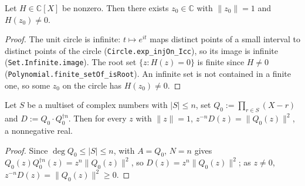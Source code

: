 \begin{lemma}
    \label{lem:fr-positive-multiple-point}
    \leanok
    Let $H \in \mathbb{C}[X]$ be nonzero. Then there exists $z_0 \in \mathbb{C}$
    with $\|z_0\| = 1$ and $H(z_0) \neq 0$.
\end{lemma}
\begin{proof}
    The unit circle is infinite: $t \mapsto e^{i t}$ maps distinct points of a
    small interval to distinct points of the circle
    (\texttt{Circle.exp\_injOn\_Icc}), so its image is infinite
    (\texttt{Set.Infinite.image}). The root set $\{z : H(z) = 0\}$ is finite
    since $H \neq 0$ (\texttt{Polynomial.finite\_setOf\_isRoot}). An infinite set
    is not contained in a finite one, so some $z_0$ on the circle has
    $H(z_0) \neq 0$.
\end{proof}

\begin{lemma}
    \label{lem:fr-D-eval-circle}
    \leanok
    Let $S$ be a multiset of complex numbers with $|S| \le n$, set
    $Q_0 := \prod_{r\in S}(X-r)$ and $D := Q_0\cdot Q_0^{\dagger n}$. Then for
    every $z$ with $\|z\| = 1$, $z^{-n}D(z) = \|Q_0(z)\|^2$, a nonnegative real.
\end{lemma}
\begin{proof}
    Since $\deg Q_0 \le |S| \le n$,  with $A = Q_0$,
    $N = n$ gives $Q_0(z)Q_0^{\dagger n}(z) = z^{n}\|Q_0(z)\|^2$, so
    $D(z) = z^{n}\|Q_0(z)\|^2$; as $z \neq 0$, $z^{-n}D(z) = \|Q_0(z)\|^2 \ge 0$.
\end{proof}

